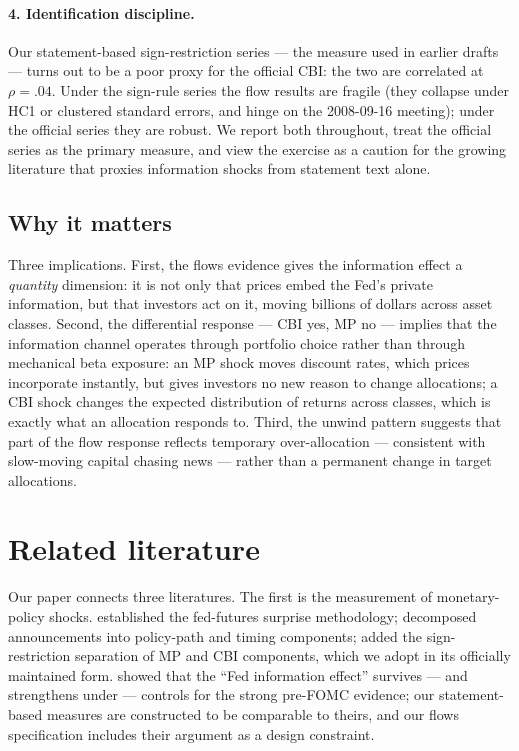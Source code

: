 \documentclass[11pt]{article}
\begin{document}
\paragraph{4. Identification discipline.} Our statement-based sign-restriction
series --- the measure used in earlier drafts --- turns out to be a poor proxy
for the official CBI: the two are correlated at $\rho=.04$. Under the
sign-rule series the flow results are fragile (they collapse under HC1 or
clustered standard errors, and hinge on the 2008-09-16 meeting); under the
official series they are robust. We report both throughout, treat the official
series as the primary measure, and view the exercise as a caution for the
growing literature that proxies information shocks from statement text alone.

\subsection{Why it matters}\label{sec:whymatters}

Three implications. First, the flows evidence gives the information effect a
\emph{quantity} dimension: it is not only that prices embed the Fed's private
information, but that investors act on it, moving billions of dollars across
asset classes. Second, the differential response --- CBI yes, MP no --- implies
that the information channel operates through portfolio choice rather than
through mechanical beta exposure: an MP shock moves discount rates, which
prices incorporate instantly, but gives investors no new reason to change
allocations; a CBI shock changes the expected distribution of returns across
classes, which is exactly what an allocation responds to. Third, the unwind
pattern suggests that part of the flow response reflects temporary
over-allocation --- consistent with slow-moving capital chasing news --- rather
than a permanent change in target allocations.

\section{Related literature}\label{sec:lit}

Our paper connects three literatures. The first is the measurement of
monetary-policy shocks. \cite{KUTTNER_2001} established the fed-futures
surprise methodology; \cite{GURKAYNAK_2005} decomposed announcements into
policy-path and timing components; \cite{JAROCINSKI_KARADI_2020} added the
sign-restriction separation of MP and CBI components, which we adopt in its
officially maintained form. \cite{BAUER_SWANSON_2023} showed that the
``Fed information effect'' survives --- and strengthens under --- controls for
the strong pre-FOMC evidence; our statement-based measures are constructed to
be comparable to theirs, and our flows specification includes their argument
as a design constraint.
\end{document}
